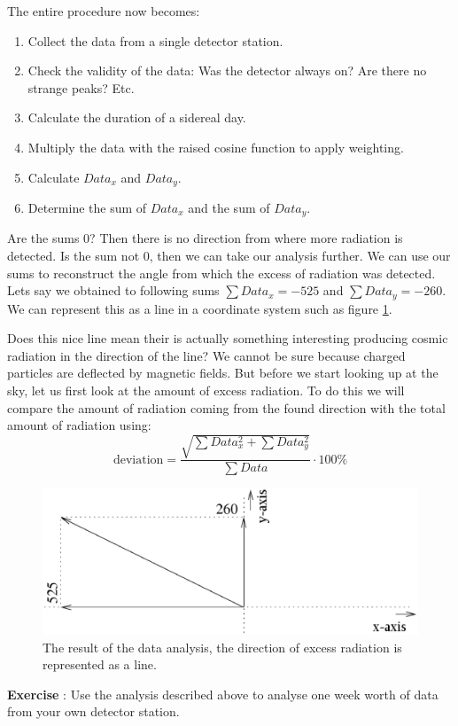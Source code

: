 \documentclass[12pt,a4paper]{article}
\numberwithin{equation}{section}
\numberwithin{figure}{section}
\newcounter{Exercise}
\numberwithin{table}{section}
\begin{document}
The entire procedure now becomes:
\begin{enumerate}[1.]
\item Collect the data from a single detector station.
\item Check the validity of the data: Was the detector always on? Are there no strange peaks? Etc.
\item Calculate the duration of a sidereal day.
\item Multiply the data with the raised cosine function to apply weighting.
\item Calculate $Data_x$ and $Data_y$.
\item Determine the sum of $Data_x$ and the sum of $Data_y$.
\end{enumerate}
Are the sums 0? Then there is no direction from where more radiation is detected. Is the sum not 0, then we can take our analysis further. We can use our sums to reconstruct the angle from which the excess of radiation was detected. Lets say we obtained to following sums $\sum Data_x = -525$  and $\sum Data_y = -260$. We can represent this as a line in a coordinate system such as figure \ref{fig:direction}. 

Does this nice line mean their is actually something interesting producing cosmic radiation in the direction of the line? We cannot be sure because charged particles are deflected by magnetic fields. But before we start looking up at the sky, let us first look at the amount of excess radiation. To do this we will compare the amount of radiation coming from the found direction with the total amount of radiation using:
\begin{equation} \mbox{deviation} = \frac{\sqrt{\sum Data_x^2 + \sum Data_y ^2}}{\sum Data} \cdot 100\% \end{equation}

\begin{figure}\begin{center}
\includegraphics[scale=0.5]{direction.eps}
\caption{The result of the data analysis, the direction of excess radiation is represented as a line.}\label{fig:direction}
\end{center}\end{figure} 

\begin{shaded}
\textbf{Exercise \theExercise {}} : Use the analysis described above to analyse one week worth of data from your own detector station.\end{shaded}
\end{document}

